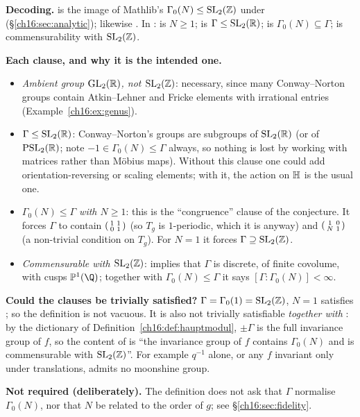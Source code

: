 \begin{dictionary}
\textbf{Decoding.}   is the image of Mathlib's
$\Gamma_0(N)\le\mathrm{SL}_2(\mathbb{Z})$ under  (\S\ref{ch16:sec:analytic}); likewise .  In
:  is $N\ge1$;  is $\Gamma\le\mathrm{SL}_2(\mathbb{R})$;
 is $\Gamma_0(N)\subseteq\Gamma$;  is commensurability with
$\mathrm{SL}_2(\mathbb{Z})$.

\textbf{Each clause, and why it is the intended one.}
\begin{itemize}
\item \emph{Ambient group $\mathrm{GL}_2(\mathbb{R})$, not $\mathrm{SL}_2(\mathbb{Z})$}: necessary, since many Conway--Norton groups contain
  Atkin--Lehner and Fricke elements with irrational entries (Example~\ref{ch16:ex:genus}).
\item \emph{$\Gamma\le\mathrm{SL}_2(\mathbb{R})$}: Conway--Norton's groups are subgroups of $\mathrm{SL}_2(\mathbb{R})$ (or of
  $\mathrm{PSL}_2(\mathbb{R})$; note $-1\in\Gamma_0(N)\le\Gamma$ always, so nothing is lost by working with matrices rather
  than M\"obius maps).  Without this clause one could add orientation-reversing or scaling elements; with it, the
  action on $\mathbb{H}$ is the usual one.
\item \emph{$\Gamma_0(N)\le\Gamma$ with $N\ge1$}: this is the ``congruence'' clause of the conjecture.  It forces
  $\Gamma$ to contain $\left(\begin{smallmatrix}1&1\\0&1\end{smallmatrix}\right)$ (so $T_g$ is $1$-periodic, which it is anyway) and $\left(\begin{smallmatrix}1&0\\N&1\end{smallmatrix}\right)$
  (a non-trivial condition on $T_g$).  For $N=1$ it forces $\Gamma\supseteq\mathrm{SL}_2(\mathbb{Z})$.
\item \emph{Commensurable with $\mathrm{SL}_2(\mathbb{Z})$}: implies that $\Gamma$ is discrete, of finite covolume, with cusps
  $\chsixteenP(\Q)$; together with $\Gamma_0(N)\le\Gamma$ it says $[\Gamma:\Gamma_0(N)]<\infty$.
\end{itemize}
\textbf{Could the clauses be trivially satisfied?}  $\Gamma=\Gamma_0(1)=\mathrm{SL}_2(\mathbb{Z})$, $N=1$ satisfies
; so the definition is not vacuous.  It is also not trivially satisfiable \emph{together with}
: by the dictionary of Definition~\ref{ch16:def:hauptmodul}, $\pm\Gamma$ is the full
invariance group of $f$, so the content of  is ``the invariance group of $f$ contains
$\Gamma_0(N)$ and is commensurable with $\mathrm{SL}_2(\mathbb{Z})$''.  For example $q^{-1}$ alone, or any $f$ invariant only
under translations, admits no moonshine group.

\textbf{Not required (deliberately).}  The definition does not ask that $\Gamma$ normalise $\Gamma_0(N)$, nor that $N$
be related to the order of $g$; see \S\ref{ch16:sec:fidelity}.
\end{dictionary}
